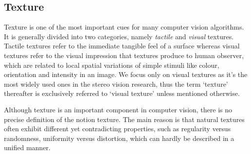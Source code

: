 \subsection{Texture}
Texture is one of the most important cues for many computer vision algorithms. It is generally divided into two categories, namely \textit{tactile} and \textit{visual} textures. Tactile textures refer to the immediate tangible feel of a surface whereas visual textures refer to the visual impression that textures produce to human observer, which are related to local spatial variations of simple stimuli like colour, orientation and intensity in an image. We focus only on visual textures as it's the most widely used ones in the stereo vision research, thus the term `texture' thereafter is exclusively referred to `visual texture' unless mentioned otherwise.

Although texture is an important component in computer vision, there is no precise definition of the notion texture. The main reason is that natural textures often exhibit different yet contradicting properties, such as regularity versus randomness, uniformity versus distortion, which can hardly be described in a unified manner. 


